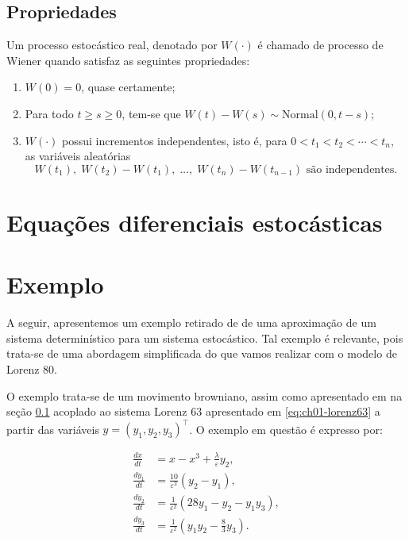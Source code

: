 \subsection{Propriedades} \label{subsec:ch02-propriedades-movimento-browniano}
Um processo estocástico real, denotado por $W(\cdot)$ é chamado de processo de Wiener quando satisfaz as seguintes propriedades:
\begin{enumerate}
    \item $W(0) = 0$, quase certamente;
    \item Para todo $t \geq s \geq 0$, tem-se que $W(t) - W(s) \sim \text{Normal}(0,t-s)$;
    \item $W(\cdot)$ possui incrementos independentes, isto é, para $0 < t_1 < t_2 < \cdots < t_n$, as variáveis aleatórias
    \begin{equation*}
        W(t_1), \; W(t_2) - W(t_1), \; \ldots, \; W(t_n) - W(t_{n-1}) \text{  são independentes.}
    \end{equation*}
\end{enumerate}

\section{Equações diferenciais estocásticas}




\section{Exemplo}

A seguir, apresentemos um exemplo retirado de \citet{Pavliotis2008} de uma aproximação de um sistema determinístico para um sistema estocástico. Tal exemplo é relevante, pois trata-se de uma abordagem simplificada do que vamos realizar com o modelo de Lorenz 80.

O exemplo trata-se de um movimento browniano, assim como apresentado em na seção \ref{subsec:ch02-propriedades-movimento-browniano} acoplado ao sistema Lorenz 63 apresentado em \ref{eq:ch01-lorenz63} a partir das variáveis $y=(y_1, y_2, y_3)^\intercal$. O exemplo em questão é expresso por:

\begin{equation}\label{eq:ch02-exemplo-de-aprox}
    \begin{aligned}
        \frac{dx}{dt} &= x - x^{3} + \frac{\lambda}{\varepsilon} y_{2}, \\
        \frac{dy_{1}}{dt} &= \frac{10}{\varepsilon^{2}} (y_{2} - y_{1}), \\
        \frac{dy_{2}}{dt} &= \frac{1}{\varepsilon^{2}} \left( 28 y_{1} - y_{2} - y_{1} y_{3} \right), \\
        \frac{dy_{3}}{dt} &= \frac{1}{\varepsilon^{2}} \left( y_{1} y_{2} - \tfrac{8}{3} y_{3} \right).
    \end{aligned}
\end{equation}

